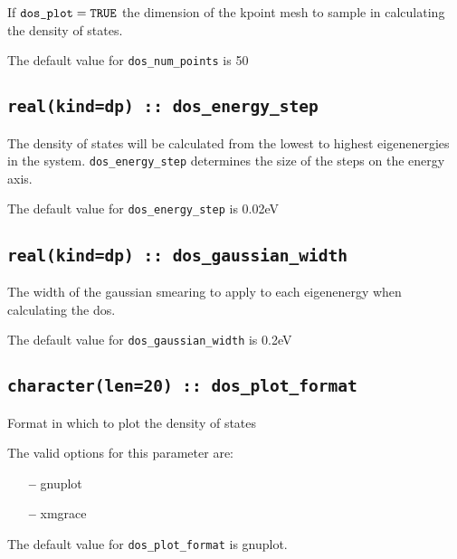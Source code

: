 If $\verb#dos_plot#=\verb#TRUE#$ the dimension of the kpoint mesh
to sample in calculating the density of states.

The default value for \verb#dos_num_points# is 50

\subsection[dos\_energy\_step]{\tt real(kind=dp) :: dos\_energy\_step}

The density of states will be calculated from the
lowest to highest eigenenergies in the system. \verb#dos_energy_step# determines
the size of the steps on the energy axis.

The default value for \verb#dos_energy_step# is 0.02eV

\subsection[dos\_gaussian\_width]{\tt real(kind=dp) :: dos\_gaussian\_width}

The width of the gaussian smearing to apply to each eigenenergy when
calculating the dos.


The default value for \verb#dos_gaussian_width# is 0.2eV

\subsection[dos\_plot\_format]{\tt character(len=20) :: dos\_plot\_format}

Format in which to plot the density of states

The valid options for this parameter are:
\begin{itemize}
\item[{\bf --}] gnuplot
\item[{\bf --}] xmgrace
\end{itemize}

The default value for \verb#dos_plot_format# is gnuplot.

